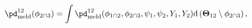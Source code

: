\begin{equation}
  \pd_{\text{meld}}^{12}(\phi_{2 \cap 3}) = 
  \int
    \pd_{\text{meld}}^{12}(\phi_{1 \cap 2}, \phi_{2 \cap 3}, \psi_{1}, \psi_{2}, Y_{1}, Y_{2})
  \text{d} \left(\boldsymbol{\Theta}_{12} \setminus \phi_{2 \cap 3}\right),
  \label{eqn:example-melded-marginal-definition}
\end{equation}